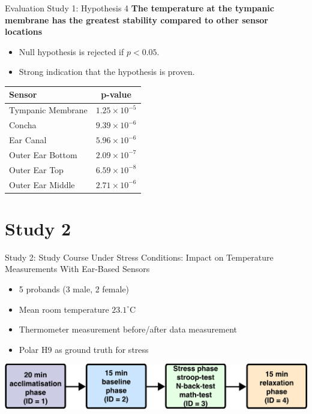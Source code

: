 \documentclass[en]{sdqbeamer}
\begin{document}
\begin{frame}{Evaluation Study 1: Hypothesis 4}
    \textbf{The temperature at the tympanic membrane has the greatest stability compared to other sensor locations}
    \begin{itemize}
        \item Null hypothesis is rejected if $p<0.05$.
        \item Strong indication that the hypothesis is proven.
    \end{itemize}
    \vspace{15pt}
    
    \begin{tabularx}{\textwidth}{|X|c|}
        \hline
        \textbf{Sensor} & \textbf{p-value} \\
        \hline
        Tympanic Membrane & \(1.25 \times 10^{-5}\) \\
        Concha & \(9.39 \times 10^{-6}\) \\
        Ear Canal & \(5.96 \times 10^{-6}\) \\
        Outer Ear Bottom & \(2.09 \times 10^{-7}\) \\
        Outer Ear Top & \(6.59 \times 10^{-8}\) \\
        Outer Ear Middle & \(2.71 \times 10^{-6}\) \\
        \hline
        \end{tabularx}
\end{frame}


\section{Study 2}
\begin{frame}{Study 2: Study Course Under Stress Conditions: Impact on Temperature Measurements With Ear-Based Sensors}
    \begin{itemize}
        \item 5 probands (3 male, 2 female)
        \item Mean room temperature $23.1^\circ\text{C}$
        \item Thermometer measurement before/after data measurement
        \item Polar H9 as ground truth for stress
    \end{itemize}
\begin{center}
  \includegraphics[width=0.95\linewidth]{../thesis-doc/images/study2/Procedure2_short.pdf}
\end{center}
\end{frame}
\end{document}
